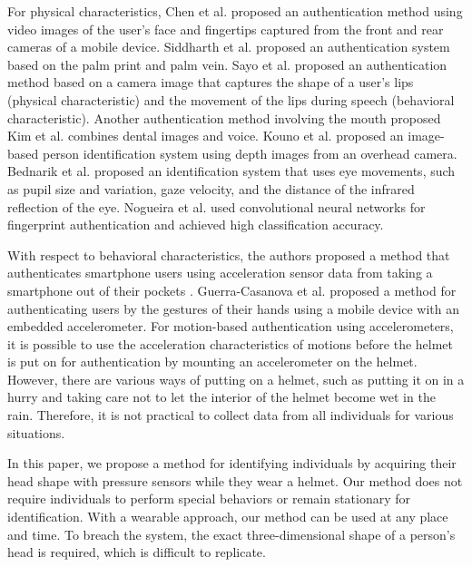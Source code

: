 \documentclass[sigconf,authordraft]{acmart}
\begin{document}
For physical characteristics, Chen et al. \cite{face_and_finger} proposed an authentication method using video images of the user's face and fingertips captured from the front and rear cameras of a mobile device. Siddharth et al. \cite{palm_print} proposed an authentication system based on the palm print and palm vein.
Sayo et al. \cite{lip_motion} proposed an authentication method based on a camera image that captures the shape of a user's lips (physical characteristic) and the movement of the lips during speech (behavioral characteristic). Another authentication method involving the mouth proposed Kim et al. \cite{teeth_and_voice} combines dental images and voice. Kouno et al. \cite{head_top_camera} proposed an image-based person identification system using depth images from an overhead camera. Bednarik et al. \cite{eye_movement} proposed an identification system that uses eye movements, such as pupil size and variation, gaze velocity, and the distance of the infrared reflection of the eye. Nogueira et al. \cite{finger_CNN} used convolutional neural networks for fingerprint authentication and achieved high classification accuracy.\par

With respect to behavioral characteristics, the authors proposed a method that authenticates smartphone users using acceleration sensor data from taking a smartphone out of their pockets \cite{murao_screen_unlock}. Guerra-Casanova et al. \cite{accelerometer_authentification} proposed a method for authenticating users by the gestures of their hands using a mobile device with an embedded accelerometer. For motion-based authentication using accelerometers, it is possible to use the acceleration characteristics of motions before the helmet is put on for authentication by mounting an accelerometer on the helmet. However, there are various ways of putting on a helmet, such as putting it on in a hurry and taking care not to let the interior of the helmet become wet in the rain. Therefore, it is not practical to collect data from all individuals for various situations.\par

In this paper, we propose a method for identifying individuals by acquiring their head shape with pressure sensors while they wear a helmet. Our method does not require individuals to perform special behaviors or remain stationary for identification. With a wearable approach, our method can be used at any place and time. To breach the system, the exact three-dimensional shape of a person's head is required, which is difficult to replicate.
\end{document}

